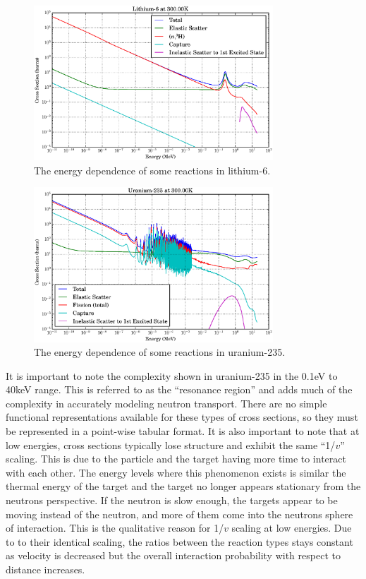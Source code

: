 \begin{figure}[h!]
  \centering
    \includegraphics[width=0.8\textwidth]{graphics/xs_li6.eps}
     \caption{The energy dependence of some reactions in lithium-6.\label{xs_e_dependence_li}}
\end{figure}

\begin{figure}[h!]
  \centering
    \includegraphics[width=0.8\textwidth]{graphics/xs_u235.eps}
    \caption{The energy dependence of some reactions in uranium-235.   \label{xs_e_dependence_u}}
\end{figure}

It is important to note the complexity shown in uranium-235 in the 0.1eV to 40keV range.  This is referred to as the ``resonance region'' and adds much of the complexity in accurately modeling neutron transport.  There are no simple functional representations available for these types of cross sections, so they must be represented in a point-wise tabular format.  It is also important to note that at low energies, cross sections typically lose structure and exhibit the same ``1/$v$'' scaling.  This is due to the particle and the target having more time to interact with each other.  The energy levels where this phenomenon exists is similar the thermal energy of the target and the target no longer appears stationary from the neutrons perspective.  If the neutron is slow enough, the targets appear to be moving instead of the neutron, and more of them come into the neutrons sphere of interaction.  This is the qualitative reason for 1/$v$ scaling at low energies.  Due to to their identical scaling, the ratios between the reaction types stays constant as velocity is decreased but the overall interaction probability with respect to distance increases.

